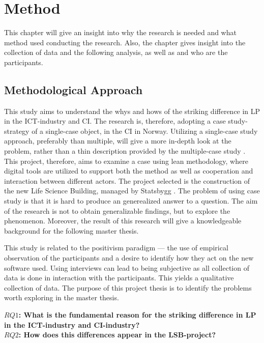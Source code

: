 
\chapter{Method}
This chapter will give an insight into why the research is needed and what method used conducting the research. Also, the chapter gives insight into the collection of data and the following analysis, as well as and who are the participants.

\section{Methodological Approach} \label{sec:purpose}
This study aims to understand the whys and hows of the striking difference in LP in the ICT-industry and CI. The research is, therefore, adopting a case study-strategy of a single-case object, in the CI in Norway. Utilizing a single-case study approach, preferably than multiple, will give a more in-depth look at the problem, rather than a thin description provided by the multiple-case study \cite{yin1993case}. This project, therefore, aims to examine a case using lean methodology, where digital tools are utilized to support both the method as well as cooperation and interaction between different actors. The project selected is the construction of the new Life Science Building, managed by Statsbygg \cite{statsbygg2019uio}. The problem of using case study is that it is hard to produce an generealized answer to a question. The aim of the research is not to obtain generalizable findings, but to explore the phenomenon. Moreover, the result of this research will give a knowledgeable background for the following master thesis.

This study is related to the positivism paradigm — the use of empirical observation of the participants and a desire to identify how they act on the new software used. Using interviews can lead to being subjective as all collection of data is done in interaction with the participants. This yields a qualitative collection of data. The purpose of this project thesis is to identify the problems worth exploring in the master thesis.

{\noindent \bf $RQ1$: What is the fundamental reason for the striking difference in LP in the ICT-industry and CI-industry?} \\
{\bf $RQ2$: How does this differences appear in the LSB-project? }

